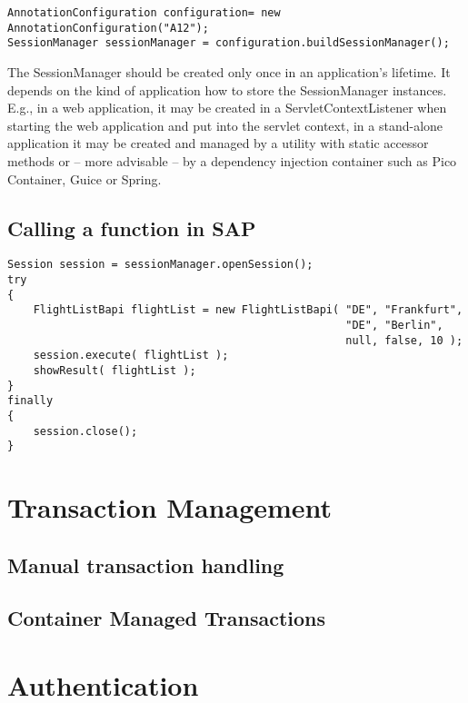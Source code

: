 \begin{lstlisting}[caption=Building the SessionManager]
AnnotationConfiguration configuration= new AnnotationConfiguration("A12"); 
SessionManager sessionManager = configuration.buildSessionManager();
\end{lstlisting}
    
The SessionManager should be created only once in an application's lifetime. It depends on the kind of application how to store the SessionManager instances. E.g., in a web application, it may be created in a ServletContextListener when starting the web application and put into the servlet context, in a stand-alone application it may be created and managed by a utility with static accessor methods or -- more advisable -- by a dependency injection container such as Pico Container, Guice or Spring.


\subsection{Calling a function in SAP}

\begin{lstlisting}[caption=Executing the BAPI function]
Session session = sessionManager.openSession();
try
{
    FlightListBapi flightList = new FlightListBapi( "DE", "Frankfurt", 
                                                    "DE", "Berlin", 
                                                    null, false, 10 );
    session.execute( flightList );
    showResult( flightList );
}
finally
{
    session.close();
}
\end{lstlisting}


\section{Transaction Management} 

\subsection{Manual transaction handling}

\subsection{Container Managed Transactions}


\section{Authentication}

